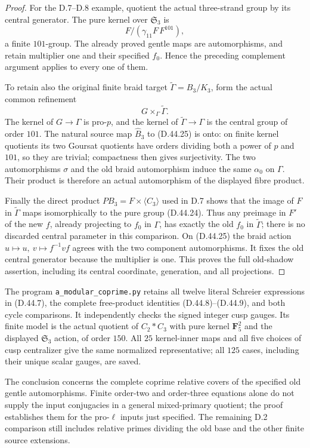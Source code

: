 \begin{proof}
For the D.7--D.8 example,
quotient the actual three-strand
group by its central
generator.
The pure kernel over
\(\mathfrak S_3\) is
\[
                 F/(\gamma_{11}F\,F^{101}),
 \tag{D.44.24}
\]
a finite \(101\)-group.
The already proved gentle
maps are automorphisms,
and retain multiplier one
and their specified \(f_0\).
Hence the preceding complement
argument applies to every
one of them.

To retain also the original
finite braid target
\(\widetilde\Gamma=B_3/K_3\),
form the actual common
refinement
\[
             G\mathbin{\times_\Gamma}
                         \widetilde\Gamma .
 \tag{D.44.25}
\]
The kernel of \(G\to\Gamma\)
is pro-\(p\), and the
kernel of
\(\widetilde\Gamma\to\Gamma\)
is the central group of
order \(101\).
The natural source map
\(\widehat B_3\) to
\textup{(D.44.25)} is onto:
on finite kernel quotients
its two Goursat quotients
have orders dividing
both a power of \(p\)
and \(101\), so they
are trivial; compactness
then gives surjectivity.
The two automorphisms
\(\sigma\) and the old
braid automorphism induce
the same \(\alpha_0\)
on \(\Gamma\).
Their product is therefore
an actual automorphism
of the displayed fibre
product.

Finally the direct product
\(PB_3=F\times\langle C_3\rangle\)
used in D.7 shows that
the image of \(F\) in
\(\widetilde\Gamma\) maps
isomorphically to the
pure group
\textup{(D.44.24)}.
Thus any preimage in \(F'\)
of the new \(f\), already
projecting to \(f_0\) in
\(\Gamma\), has exactly
the old \(f_0\) in
\(\widetilde\Gamma\);
there is no discarded
central parameter in
this comparison.
On \textup{(D.44.25)}
the braid action
\(u\mapsto u,\ v\mapsto f^{-1}vf\)
agrees with the two
component automorphisms.
It fixes the old central
generator because the
multiplier is one.
This proves the full
old-shadow assertion,
including its central
coordinate, generation,
and all projections.
\end{proof}

The program
\texttt{a\_modular\_coprime.py}
retains all twelve literal
Schreier expressions in
\textup{(D.44.7)}, the
complete free-product
identities
\textup{(D.44.8)--(D.44.9)},
and both cycle comparisons.
It independently checks
the signed integer cusp
gauges.
Its finite model is the
actual quotient of
\(C_2*C_3\) with pure
kernel \(\mathbf F_5^2\)
and the displayed
\(\mathfrak S_3\) action,
of order \(150\).
All \(25\) kernel-inner
maps and all five choices
of cusp centralizer
give the same normalized
representative; all
\(125\) cases, including
their unique scalar
gauges, are saved.

The conclusion concerns
the complete coprime
relative covers of the
specified old gentle
automorphisms.
Finite order-two and
order-three equations
alone do not supply the
input conjugacies in a
general mixed-primary
quotient; the proof
establishes them for
the pro-\(\ell\) inputs
just specified.
The remaining D.2
comparison still includes
relative primes dividing
the old base and the
other finite source
extensions.

